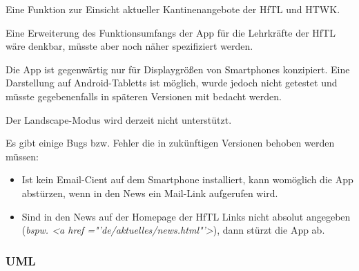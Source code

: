 \begin{description}

Eine Funktion zur Einsicht aktueller Kantinenangebote der HfTL und HTWK.


Eine Erweiterung des Funktionsumfangs der App für die Lehrkräfte der HfTL wäre denkbar, müsste aber noch näher spezifiziert werden.


Die App ist gegenwärtig nur für Displaygrößen von Smartphones konzipiert. Eine Darstellung auf Android-Tabletts ist möglich, wurde jedoch nicht getestet und müsste gegebenenfalls in späteren Versionen mit bedacht werden.


Der Landscape-Modus wird derzeit nicht unterstützt.

Es gibt einige Bugs bzw. Fehler die in zukünftigen Versionen behoben werden müssen:
\begin{itemize}
\item Ist kein Email-Cient auf dem Smartphone installiert, kann womöglich die App abstürzen, wenn in den News ein Mail-Link aufgerufen wird.
\item Sind in den News auf der Homepage der HfTL Links nicht absolut angegeben (\textit{bspw. \textless a href ="'de/aktuelles/news.html"'\textgreater}), dann stürzt die App ab. 
\end{itemize}
\end{description} 

\newpage

\subsubsection{UML}



\begin{landscape}
	
\end{landscape}





\begin{landscape}
	
\end{landscape}

